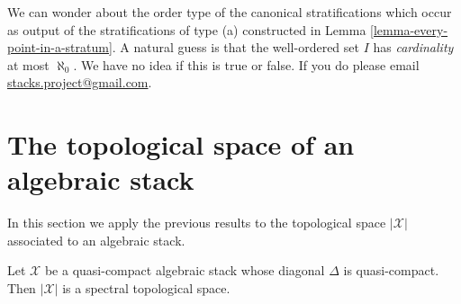 \begin{remark}
\label{remark-order-type}
We can wonder about the order type of the canonical stratifications which
occur as output of the stratifications of type (a) constructed in
Lemma \ref{lemma-every-point-in-a-stratum}.
A natural guess is that the well-ordered set $I$ has
{\it cardinality} at most $\aleph_0$. We have no idea if this is true
or false. If you do please email
\href{mailto:stacks.project@gmail.com}{stacks.project@gmail.com}.
\end{remark}







\section{The topological space of an algebraic stack}
\label{section-topology}

\noindent
In this section we apply the previous results to the topological
space $|\mathcal{X}|$ associated to an algebraic stack.

\begin{lemma}
\label{lemma-spectral-qc-diagonal-qc}
Let $\mathcal{X}$ be a quasi-compact algebraic stack
whose diagonal $\Delta$ is quasi-compact.
Then $|\mathcal{X}|$ is a spectral topological space.
\end{lemma}


